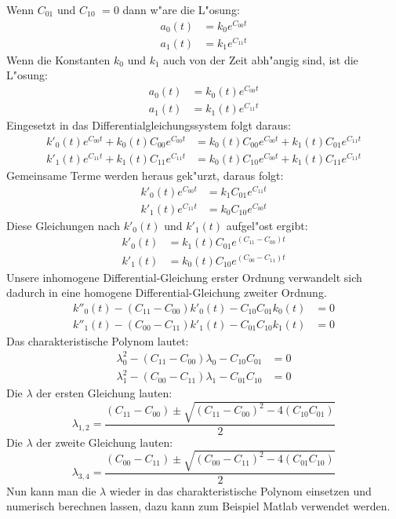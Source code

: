 \begin{refsection}
Wenn $ C_{01}$ und $ C_{10}$ $ =0$ dann w"are die L"osung:
\begin{align*}
a_{0}(t)&= k_0 e^{C_{00} t} 
\\
a_{1}(t)&= k_1 e^{C_{11} t}
\end{align*}
Wenn die Konstanten $ k_0 $ und $ k_1 $
auch von der Zeit abh"angig sind, ist die L"osung: 
\begin{align*}
a_{0}(t)&= k_0(t) e^{C_{00} t} 
\\
a_{1}(t)&= k_1(t) e^{C_{11} t} 
\end{align*}
Eingesetzt in das Differentialgleichungssystem folgt daraus:
\begin{align*}
k'_{0}(t) e^{C_{00} t} + k_{0}(t) C_{00} e^{C_{00} t}&= k_{0}(t) C_{00} e^{C_{00} t} + k_{1}(t)C_{01}e^{C_{11} t}
\\
k'_{1}(t) e^{C_{11} t} + k_{1}(t) C_{11} e^{C_{11} t}&= k_{0}(t) C_{10} e^{C_{00} t} + k_{1}(t)C_{11}e^{C_{11} t}
\end{align*}
Gemeinsame Terme werden heraus gek"urzt, daraus folgt:
\begin{align*}
k'_{0}(t) e^{C_{00} t}&= k_{1} C_{01} e^{C_{11} t}
\\
k'_{1}(t) e^{C_{11} t}&= k_{0} C_{10} e^{C_{00} t}
\end{align*}
Diese Gleichungen nach $ k'_{0}(t)$ und $ k'_{1}(t)$ aufgel"ost ergibt:
\begin{align*}
k'_{0}(t)&= k_{1}(t) C_{01} e^{(C_{11}-C_{00}) t}
\\
k'_{1}(t)&= k_{0}(t) C_{10} e^{(C_{00}-C_{11}) t}
\end{align*}
Unsere inhomogene Differential-Gleichung erster Ordnung verwandelt
sich dadurch in eine homogene Differential-Gleichung zweiter Ordnung.
\begin{align*}
k''_{0}(t) - (C_{11}-C_{00}) k'_{0}(t) - C_{10}C_{01}k_0(t)&= 0
\\
k''_{1}(t) - (C_{00}-C_{11}) k'_{1}(t) - C_{01}C_{10}k_1(t)&= 0
\end{align*}
Das charakteristische Polynom lautet:
\begin{align*}
\lambda_{0}^{2} - (C_{11}-C_{00})\lambda_{0} - C_{10}C_{01}&= 0
\\
\lambda_{1}^{2} - (C_{00}-C_{11})\lambda_{1} - C_{01}C_{10}&= 0
\end{align*}
Die $ \lambda $ der ersten Gleichung lauten:
\[
\lambda_{1,2} = \frac{(C_{11}-C_{00})\pm \sqrt{(C_{11}-C_{00})^2-4(C_{10}C_{01})}}{2}
\]
Die $ \lambda $ der zweite Gleichung lauten:
\[
\lambda_{3,4} = \frac{(C_{00}-C_{11})\pm \sqrt{(C_{00}-C_{11})^2-4(C_{01}C_{10})}}{2}
\]
Nun kann man die $\lambda$ wieder in das charakteristische Polynom
einsetzen und numerisch berechnen lassen, dazu kann zum Beispiel Matlab
verwendet werden.


\end{refsection}

